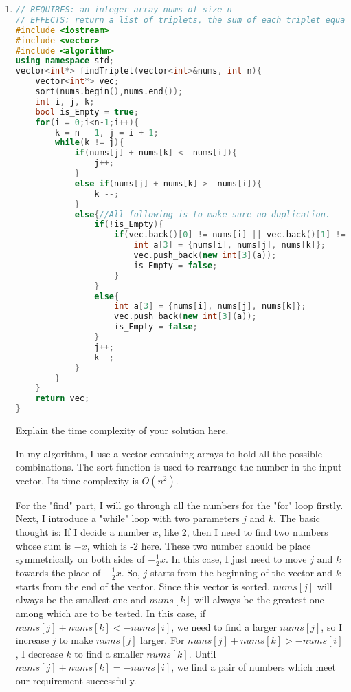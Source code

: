 \documentclass[12pt,a4paper]{article}
\makeatletter
\newtheorem*{solution}{Solution}
\theoremstyle{definition}
\renewenvironment{solution}[1][Solution] {\par\pushQED{\qed}\normalfont\topsep6\p@\@plus6\p@\relax\trivlist\item[\hskip\labelsep\bfseries#1\@addpunct{.}]\ignorespaces}{\popQED\endtrivlist\@endpefalse} \makeatother
\makeatother
\begin{document}
\begin{enumerate}
\begin{solution}
	\begin{lstlisting}[language=C++]
// REQUIRES: an integer array nums of size n
// EFFECTS: return a list of triplets, the sum of each triplet equals to 0.
#include <iostream>
#include <vector>
#include <algorithm>
using namespace std;
vector<int*> findTriplet(vector<int>&nums, int n){
    vector<int*> vec;
    sort(nums.begin(),nums.end());
    int i, j, k;
    bool is_Empty = true;
    for(i = 0;i<n-1;i++){
        k = n - 1, j = i + 1;
        while(k != j){
            if(nums[j] + nums[k] < -nums[i]){
                j++;
            }
            else if(nums[j] + nums[k] > -nums[i]){
                k --;
            }
            else{//All following is to make sure no duplication.
                if(!is_Empty){
                    if(vec.back()[0] != nums[i] || vec.back()[1] != nums[j] || vec.back()[2] != nums[k]){
                        int a[3] = {nums[i], nums[j], nums[k]};
                        vec.push_back(new int[3](a));
                        is_Empty = false;
                    }
                }
                else{
                    int a[3] = {nums[i], nums[j], nums[k]};
                    vec.push_back(new int[3](a));
                    is_Empty = false;
                }
                j++;
                k--;
            }
        }
    }
    return vec;
}
	\end{lstlisting}
Explain the time complexity of your solution here.

In my algorithm, I use a vector containing arrays to hold all the possible combinations. The sort function is used to rearrange the number in the input vector. Its time complexity is $O(n^2)$. 

For the "find" part, I will go through all the numbers for the "for" loop firstly. Next, I introduce a "while" loop with two parameters $j$ and $k$. The basic thought is: If I decide a number $x$, like 2, then I need to find two numbers whose sum is $-x$, which is -2 here. These two number should be place symmetrically on both sides of $-\frac{1}{2}x$. In this case, I just need to move $j$ and $k$ towards the place of $-\frac{1}{2}x$. So, $j$ starts from the beginning of the vector and $k$ starts from the end of the vector. Since this vector is sorted, $nums[j]$ will always be the smallest one and $nums[k]$ will always be the greatest one among which are to be tested. In this case, if $nums[j] + nums[k] < -nums[i]$, we need to find a larger $nums[j]$, so I increase $j$ to make $nums[j]$ larger. For $nums[j] + nums[k] > -nums[i]$, I decrease $k$ to find a smaller $nums[k]$. Until $nums[j] + nums[k] = -nums[i]$, we find a pair of numbers which meet our requirement successfully.


\end{solution}
\end{enumerate}
\end{document}
